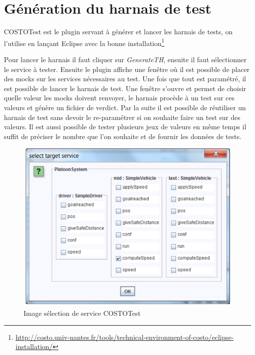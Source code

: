 \section{Génération du harnais de test}
\label{sec:harnaisGeneration}

COSTOTest est le plugin servant à générer et lancer les harnais de tests, on l'utilise en lançant Eclipse avec la bonne installation\footnote{\url{http://costo.univ-nantes.fr/tools/technical-environment-of-costo/eclipse-installation/}}

Pour lancer le harnais il faut cliquer sur \textit{GenerateTH}, ensuite il faut sélectionner le service à tester. Ensuite le plugin affiche une fenêtre où il est possible de placer des mocks sur les services nécessaires au test. Une fois que tout est paramétré, il est possible de lancer le harnais de test. Une fenêtre s'ouvre et permet de choisir quelle valeur les mocks doivent renvoyer, le harnais procède à un test sur ces valeurs et génère un fichier de verdict. Par la suite il est possible de réutiliser un harnais de test sans devoir le re-paramétrer si on souhaite faire un test sur des valeurs. Il est aussi possible de tester plusieurs jeux de valeurs en même temps il suffit de préciser le nombre que l'on souhaite et de fournir les données de tests.
\clearpage
    \vspace*{\fill}
\begin{figure}[H]
    \begin{center}
        \includegraphics[scale=0.8]{images/SelectionServiceCOSTOTest.png}
        \caption{Image sélection de service COSTOTest}
        \label{fig:SelectionServiceCOSTOTest}
    \end{center}
\end{figure}

